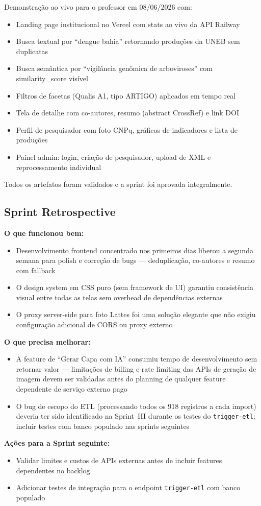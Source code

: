 \documentclass[12pt,a4paper]{article}
\begin{document}
Demonstração ao vivo para o professor em 08/06/2026 com:
\begin{itemize}[noitemsep]
  \item Landing page institucional no Vercel com stats ao vivo da API Railway
  \item Busca textual por ``dengue bahia'' retornando produções da UNEB sem duplicatas
  \item Busca semântica por ``vigilância genômica de arboviroses'' com similarity\_score visível
  \item Filtros de facetas (Qualis A1, tipo ARTIGO) aplicados em tempo real
  \item Tela de detalhe com co-autores, resumo (abstract CrossRef) e link DOI
  \item Perfil de pesquisador com foto CNPq, gráficos de indicadores e lista de produções
  \item Painel admin: login, criação de pesquisador, upload de XML e reprocessamento individual
\end{itemize}
Todos os artefatos foram validados e a sprint foi aprovada integralmente.

\subsection{Sprint Retrospective}

\textbf{O que funcionou bem:}
\begin{itemize}[noitemsep]
  \item Desenvolvimento frontend concentrado nos primeiros dias liberou a segunda semana para polish
        e correção de bugs — deduplicação, co-autores e resumo com fallback
  \item O design system em CSS puro (sem framework de UI) garantiu consistência visual entre todas
        as telas sem overhead de dependências externas
  \item O proxy server-side para foto Lattes foi uma solução elegante que não exigiu configuração
        adicional de CORS ou proxy externo
\end{itemize}

\textbf{O que precisa melhorar:}
\begin{itemize}[noitemsep]
  \item A feature de ``Gerar Capa com IA'' consumiu tempo de desenvolvimento sem retornar valor —
        limitações de billing e rate limiting das APIs de geração de imagem devem ser validadas antes
        do planning de qualquer feature dependente de serviço externo pago
  \item O bug de escopo do ETL (processando todos os 918 registros a cada import) deveria ter sido
        identificado na Sprint~III durante os testes do \texttt{trigger-etl}; incluir testes com
        banco populado nas sprints seguintes
\end{itemize}

\textbf{Ações para a Sprint seguinte:}
\begin{itemize}[noitemsep]
  \item Validar limites e custos de APIs externas antes de incluir features dependentes no backlog
  \item Adicionar testes de integração para o endpoint \texttt{trigger-etl} com banco populado
\end{itemize}
\end{document}
